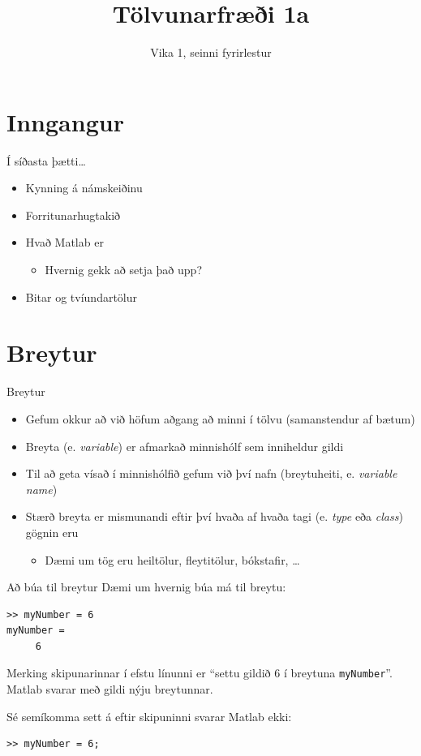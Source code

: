 \documentclass[handout]{beamer}
\title{Tölvunarfræði 1a}
\subtitle{Vika 1, seinni fyrirlestur}
\begin{document}
\begin{frame}
\titlepage
\end{frame}

\section{Inngangur}

\begin{frame}{Í síðasta þætti\ldots}
\begin{itemize}
 \item Kynning á námskeiðinu
 \item Forritunarhugtakið
 \item Hvað Matlab er
 \begin{itemize}
  \item Hvernig gekk að setja það upp?
 \end{itemize}
 \item Bitar og tvíundartölur
\end{itemize}
\end{frame}

\section{Breytur}

\begin{frame}{Breytur}
\begin{itemize}
 \item Gefum okkur að við höfum aðgang að minni í tölvu (samanstendur af bætum)
 \item Breyta (e. \emph{variable}) er afmarkað minnishólf sem inniheldur gildi
 \item Til að geta vísað í minnishólfið gefum við því nafn (breytuheiti, e. \emph{variable name})
 \item Stærð breyta er mismunandi eftir því hvaða af hvaða tagi (e. \emph{type} eða \emph{class}) gögnin eru
 \begin{itemize}
  \item Dæmi um tög eru heiltölur, fleytitölur, bókstafir, \ldots
 \end{itemize}
\end{itemize}
\end{frame}

\begin{frame}[fragile]{Að búa til breytur}
Dæmi um hvernig búa má til breytu:
\begin{verbatim}
>> myNumber = 6
myNumber =  
     6
\end{verbatim}
Merking skipunarinnar í efstu línunni er ``settu gildið $6$ í breytuna \texttt{myNumber}''. Matlab svarar með gildi nýju breytunnar.

Sé semíkomma sett á eftir skipuninni svarar Matlab ekki:
\begin{verbatim}
>> myNumber = 6;
\end{verbatim}
\end{frame}
\end{document}
